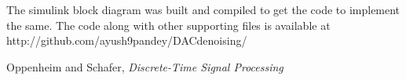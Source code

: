 \documentclass[colorlinks=true,pdfstartview=FitV,linkcolor=blue,
            citecolor=red,urlcolor=magenta]{ligodoc}
\begin{document}
The simulink block diagram was built and compiled to get the code to implement the same. The code along with other supporting files is available at http://github.com/ayush9pandey/DACdenoising/


\begin{thebibliography}{1}  
 Oppenheim and Schafer, \emph{Discrete-Time Signal Processing}
\end{thebibliography}        
\end{document}
